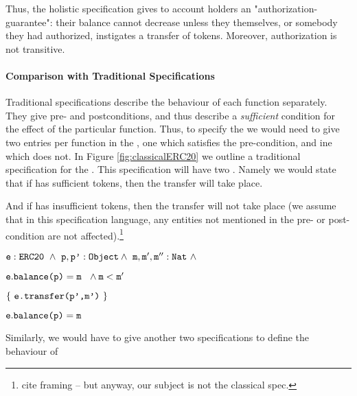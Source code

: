  

 Thus, the holistic specification  gives  to  account holders an "authorization-guarantee": their balance cannot decrease unless they themselves,  or somebody they had  authorized, instigates a transfer of tokens. Moreover, authorization is not transitive.
 
\paragraph{Comparison with Traditional Specifications}
 
 Traditional  specifications %
 describe the behaviour of each function separately.
 They  give pre- and postconditions, %
  and thus describe a  {\em sufficient} condition for the effect of the particular function.
  Thus, to specify the  we would need to give two 
  entries per function in the , one which satisfies the pre-condition, and ine which does not.
In Figure \ref{fig:classicalERC20} we outline   a traditional specification for the .
This specification will have two . 
Namely we would state
 that if  has sufficient tokens, then the transfer will take place.  
 
 

\noindent
And if  has insufficient tokens, then the transfer will not take place (we assume that in this
specification language, any entities not mentioned in the pre- or post-condition are not affected).\footnote{cite framing -- but anyway, our subject is not the classical spec.}
 
 \vspace{.15cm}
\noindent
\strut \hspace{0.5cm}  $ \prg{e}:\prg{ERC20}\ \wedge\  \prg{p},\prg{p'}:\prg{Object} 
  \wedge\ \prg{m},\prg{m}',\prg{m}'':\prg{Nat}\ \wedge\  $ \\
\strut \hspace{0.5cm} $ \prg{e}.\prg{balance(p)} = \prg{m} \ \ \wedge \prg{m} <  \prg{m}' $\\
 \strut \hspace{0.9cm} $\{ \ \prg{e.transfer(p',m')} \ \} $ \\
\strut \hspace{0.5cm} $ {\mbox{\tt{e}}}.{\mbox{\tt{balance(p)}}} = {\mbox{\tt{m}}}$
\vspace{.15cm}
 
 Similarly, we would have to give another two specifications to define the behaviour of 


